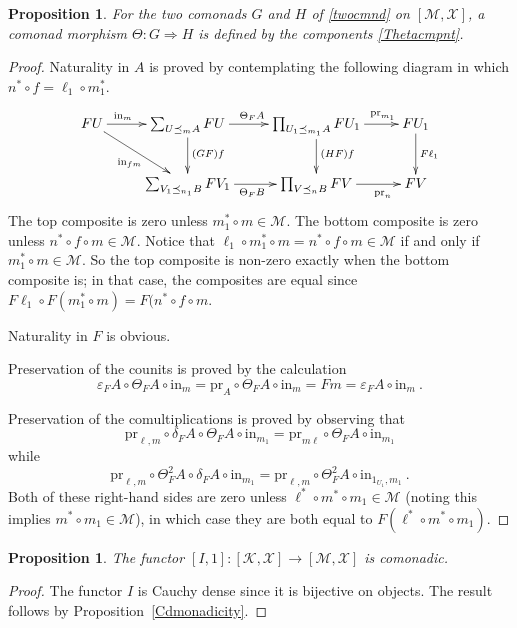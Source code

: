 \documentclass[a4paper,12pt,reqno]{amsart}
\newtheorem{proposition}[theorem]{Proposition}
\theoremstyle{definition}
\theoremstyle{fact}
\theoremstyle{genquest}
\theoremstyle{step}
\newcommand{\ra}{\rightarrow}
\def\CK{{\mathscr K}}
\def\CM{{\mathscr M}}
\def\CX{{\mathscr X}}
\begin{document}
\begin{proposition}
For the two comonads $G$ and $H$ of \eqref{twocmnd} on $[\CM,\CX]$, a comonad morphism $\Theta : G \Rightarrow H$ is defined by the components \eqref{Thetacmpnt}.
\end{proposition}
\begin{proof}
Naturality in $A$ is proved by contemplating the following diagram in which $n^*\circ f=\ell_1\circ m_1^*$.
\begin{equation*}
\xymatrix{
FU \ar[r]^{\mathrm{in}_{m \phantom{AAAA}} \ } \ar[rd]_{\mathrm{in}_{fm}}  & \sum_{U\preceq_m A}{FU}\ar[d]^{(GF)f} \ar[r]^{\Theta_FA} & \prod_{U_1\preceq_{m_1} A}{FU_1} \ar[d]^{(HF)f} \ar[r]^{ \phantom{AAAA} \mathrm{pr}_{m_1}} 
& FU_1 \ar[d]^{F\ell_1} \\
   & \sum_{V_1\preceq_{n_1} B}{FV_1}\ar[r]_{\Theta_FB} & \prod_{V\preceq_n B}{FV}\ar[r]_{\phantom{AAAA} \mathrm{pr}_n} 
& FV }
\end{equation*}
The top composite is zero unless $m_1^*\circ m\in \CM$. 
The bottom composite is zero unless $n^*\circ f\circ m\in \CM$. 
Notice that $\ell_1\circ m_1^*\circ m = n^*\circ f\circ m\in \CM$ if and only if $m_1^*\circ m\in \CM$. So the top composite is non-zero exactly when the bottom composite is; in that case, the composites are equal since $F\ell_1 \circ F(m_1^*\circ m) = F(n^*\circ f\circ m$.  

Naturality in $F$ is obvious. 

Preservation of the counits is proved by the calculation
$$\varepsilon_FA\circ \Theta_FA \circ \mathrm{in}_m = \mathrm{pr}_A\circ \Theta_FA \circ \mathrm{in}_m
= Fm = \varepsilon_FA\circ \mathrm{in}_m \ .$$ 

Preservation of the comultiplications is proved by observing that 
$$\mathrm{pr}_{\ell, m} \circ \delta_FA \circ \Theta_FA \circ \mathrm{in}_{m_1}
= \mathrm{pr}_{m\ell} \circ \Theta_FA \circ \mathrm{in}_{m_1}$$
while
$$\mathrm{pr}_{\ell, m} \circ \Theta^2_FA \circ \delta_FA  \circ \mathrm{in}_{m_1}
= \mathrm{pr}_{\ell, m} \circ \Theta^2_FA \circ \mathrm{in}_{1_{U_1}, m_1} \ .$$
Both of these right-hand sides are zero unless $\ell^*\circ m^*\circ m_1 \in \CM$ 
(noting this implies $m^*\circ m_1 \in \CM$), in which case they are both equal to $F(\ell^*\circ m^*\circ m_1)$. 
\end{proof}

\begin{proposition}
The functor $[I,1] : [\CK,\CX]\ra [\CM,\CX]$ is comonadic.
\end{proposition}
\begin{proof}
The functor $I$ is Cauchy dense since it is bijective on objects.
The result follows by Proposition~\ref{Cdmonadicity}.
\end{proof}
\end{document}
